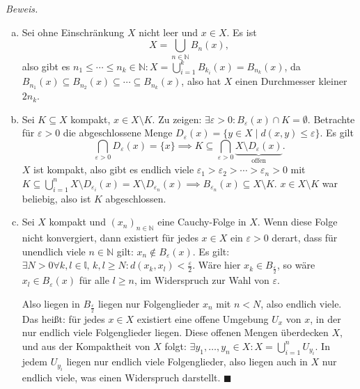 \documentclass[12pt]{scrbook}   %
\newcommand{\qed}{\phantom{.}\hfill{$\blacksquare$}}
\begin{document}
{\it Beweis.} 
\begin{enumerate}[a)]
\item Sei ohne Einschränkung $X$ nicht leer und $x\in X$. 
Es ist $$X=\bigcup_{n\in \mathbb N} B_n(x),$$ also gibt es $n_1 \le \cdots \le n_k\in \mathbb N: X= \bigcup_{i=1}^kB_{k_i}(x)= B_{n_k}(x)$, da $B_{n_1}(x)\subseteq B_{n_2}(x) \subseteq \cdots \subseteq B_{n_k}(x)$, also hat $X$ einen Durchmesser kleiner $2n_k$.

\item Sei $K\subseteq X$ kompakt, $x\in X\setminus K$. Zu zeigen: $\exists \varepsilon > 0 : B_\varepsilon(x) \cap K = \emptyset$. Betrachte für $\varepsilon>0$ die abgeschlossene Menge $D_\varepsilon(x) = \{y\in X \mid d(x,y) \le \varepsilon\}$. Es gilt
$$ \bigcap_{\varepsilon >0} D_{\varepsilon}(x) = \{x\} \implies K\subseteq \bigcap_{\varepsilon>0} \underbrace{X\setminus D_{\varepsilon}(x)}_{\text {offen}}.$$
$X$ ist kompakt, also gibt es endlich viele $\varepsilon_1 > \varepsilon_2 > \cdots >\varepsilon_n >0$ mit $K\subseteq \bigcup _{i=1}^n X\setminus D_{\varepsilon_i}(x) = X \setminus D_{\varepsilon_n}(x) \implies B_{\varepsilon_n}(x) \subseteq X\setminus K$. $x\in X\setminus K$ war beliebig, also ist $K$ abgeschlossen.

\item Sei $X$ kompakt und $(x_n)_{n\in\mathbb N}$ eine Cauchy-Folge in $X$. Wenn diese Folge nicht konvergiert, dann existiert für jedes $x\in X$ ein $\varepsilon>0$ derart, dass für unendlich viele $n\in \mathbb N$ gilt: $x_n \notin B_\varepsilon(x)$. Es gilt: $\exists N > 0 \forall k, l \in \mathbb l,\, k,l\ge N: d(x_k,x_l) < \frac\varepsilon2$. Wäre hier $x_k \in B_{\frac \varepsilon 2}$, so wäre $x_l \in B_\varepsilon(x)$ für alle $l\ge n$, im Widerspruch zur Wahl von $\varepsilon$.

Also liegen in $B_{\frac\varepsilon2}$ liegen nur Folgenglieder $x_n$ mit $n<N$, also endlich viele. Das heißt: für jedes $x\in X$ existiert eine offene Umgebung $U_x$ von $x$, in der nur endlich viele Folgenglieder liegen. Diese offenen Mengen überdecken $X$, und aus der Kompaktheit von $X$ folgt: $\exists y_1,\ldots,y_n \in X: X= \bigcup_{i=1}^n U_{y_i}$. In jedem $U_{y_i}$ liegen nur endlich viele Folgenglieder, also liegen auch in $X$ nur endlich viele, was einen Widerspruch darstellt.  \qed
\end{enumerate}
\end{document}
